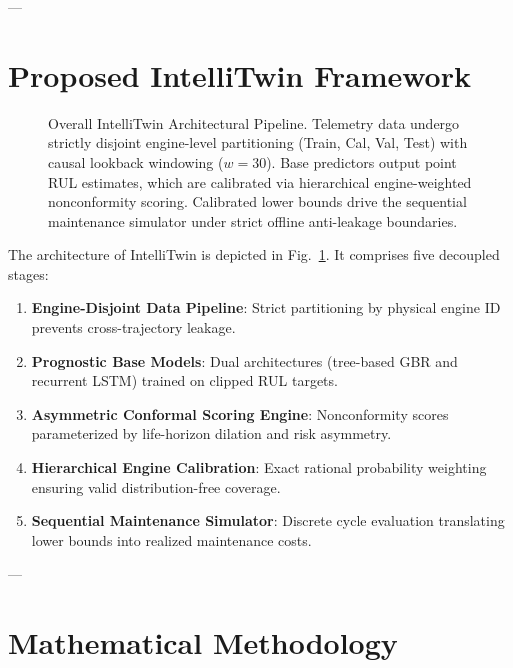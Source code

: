 \documentclass[conference]{IEEEtran}
\begin{document}
---

\section{Proposed IntelliTwin Framework}

\begin{figure}[t]
\centering

\caption{Overall IntelliTwin Architectural Pipeline. Telemetry data undergo strictly disjoint engine-level partitioning (Train, Cal, Val, Test) with causal lookback windowing ($w=30$). Base predictors output point RUL estimates, which are calibrated via hierarchical engine-weighted nonconformity scoring. Calibrated lower bounds drive the sequential maintenance simulator under strict offline anti-leakage boundaries.}
\label{fig:architecture}
\end{figure}

The architecture of IntelliTwin is depicted in Fig.~\ref{fig:architecture}. It comprises five decoupled stages:
\begin{enumerate}
    \item \textbf{Engine-Disjoint Data Pipeline}: Strict partitioning by physical engine ID prevents cross-trajectory leakage.
    \item \textbf{Prognostic Base Models}: Dual architectures (tree-based GBR and recurrent LSTM) trained on clipped RUL targets.
    \item \textbf{Asymmetric Conformal Scoring Engine}: Nonconformity scores parameterized by life-horizon dilation and risk asymmetry.
    \item \textbf{Hierarchical Engine Calibration}: Exact rational probability weighting ensuring valid distribution-free coverage.
    \item \textbf{Sequential Maintenance Simulator}: Discrete cycle evaluation translating lower bounds into realized maintenance costs.
\end{enumerate}

---

\section{Mathematical Methodology}
\end{document}
